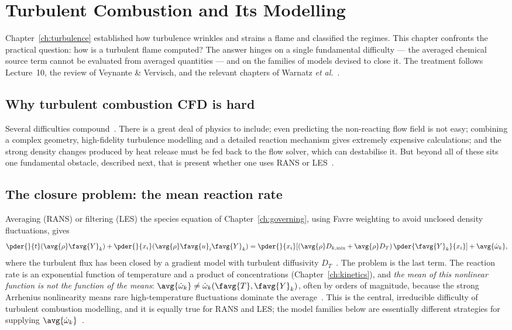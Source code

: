 \chapter{Turbulent Combustion and Its Modelling}\label{ch:turbcomb}

Chapter~\ref{ch:turbulence} established how turbulence wrinkles and strains a flame and classified the regimes. This chapter confronts the practical question: how is a turbulent flame computed? The answer hinges on a single fundamental difficulty --- the averaged chemical source term cannot be evaluated from averaged quantities --- and on the families of models devised to close it. The treatment follows Lecture~10, the review of Veynante \& Vervisch, and the relevant chapters of Warnatz \emph{et al.}~\cite{lecture10,veynante2002turbulent,warnatz2006combustion}.

\section{Why turbulent combustion CFD is hard}

Several difficulties compound~\cite{lecture10}. There is a great deal of physics to include; even predicting the non-reacting flow field is not easy; combining a complex geometry, high-fidelity turbulence modelling and a detailed reaction mechanism gives extremely expensive calculations; and the strong density changes produced by heat release must be fed back to the flow solver, which can destabilise it. But beyond all of these sits one fundamental obstacle, described next, that is present whether one uses RANS or LES~\cite{lecture10}.

\section{The closure problem: the mean reaction rate}

Averaging (RANS) or filtering (LES) the species equation of Chapter~\ref{ch:governing}, using Favre weighting to avoid unclosed density fluctuations, gives
\begin{equation}
\pder{}{t}(\avg{\rho}\favg{Y}_k)+\pder{}{x_i}(\avg{\rho}\favg{u}_i\favg{Y}_k)
=\pder{}{x_i}\!\left[(\avg{\rho}D_{k,\mathrm{mix}}+\avg{\rho}D_T)\,\pder{\favg{Y}_k}{x_i}\right]+\avg{\dot\omega_k},
\label{eq:favre-species}
\end{equation}
where the turbulent flux has been closed by a gradient model with turbulent diffusivity $D_T$~\cite{lecture10}. The problem is the last term. The reaction rate is an exponential function of temperature and a product of concentrations (Chapter~\ref{ch:kinetics}), and \emph{the mean of this nonlinear function is not the function of the means}: $\avg{\dot\omega_k}\ne\dot\omega_k(\favg{T},\favg{Y}_k)$, often by orders of magnitude, because the strong Arrhenius nonlinearity means rare high-temperature fluctuations dominate the average~\cite{lecture10,veynante2002turbulent}. This is the central, irreducible difficulty of turbulent combustion modelling, and it is equally true for RANS and LES; the model families below are essentially different strategies for supplying $\avg{\dot\omega_k}$~\cite{lecture10}.

